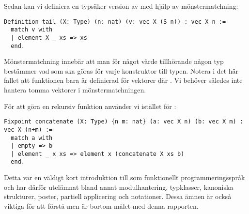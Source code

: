 Sedan kan vi definiera en typsäker version av  med hjälp av
mönstermatchning:
\begin{lstlisting}
Definition tail (X: Type) (n: nat) (v: vec X (S n)) : vec X n :=
  match v with
  | element X _ xs => xs
  end.
\end{lstlisting}
Mönstermatchning innebär att man för något värde tillhörande någon typ
bestämmer vad som ska göras för varje konstruktor till typen. Notera i det här
fallet att funktionen bara är definierad för vektorer  där . Vi behöver således inte hantera tomma vektorer i mönstermatchningen.

För att göra en rekursiv funktion använder vi  istället för
:
\begin{lstlisting}
Fixpoint concatenate (X: Type) {n m: nat} (a: vec X n) (b: vec X m) : vec X (n+m) :=
  match a with
  | empty => b
  | element _ x xs => element x (concatenate X xs b)
  end.
\end{lstlisting}

Detta var en väldigt kort introduktion till \coq som funktionellt
programmeringsspråk och har därför utelämnat bland annat modulhantering,
typklasser, kanoniska strukturer, poster, partiell applicering och notationer.
Dessa ämnen är också viktiga för att förstå \coq men är bortom målet med denna
rapporten.
